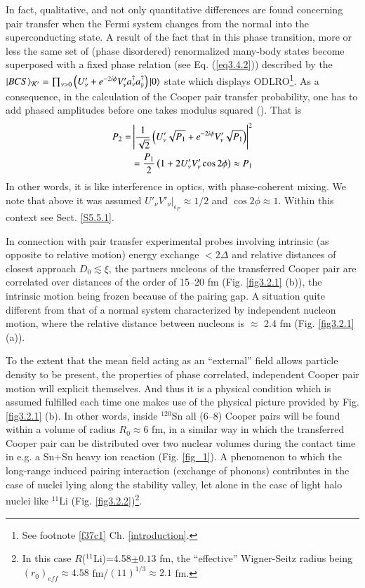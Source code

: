In fact, qualitative, and not only quantitative differences are found concerning pair transfer  when the Fermi system changes from the normal into the superconducting state. A result of the fact that in this phase transition, more or less the same set of (phase disordered) renormalized many-body states  become superposed with a fixed phase relation (see Eq. (\ref{eq3.4.2})) described by the $|{BCS} \rangle_{\mathcal K'}=\prod_{\nu>0}\left(U'_\nu+e^{-2i\phi} V'_\nu a_\nu^\dagger a^\dagger_{\tilde\nu}\right)|{0} \rangle$ state which displays 
 ODLRO\footnote{See footnote \ref{f37c1} Ch. \ref{introduction}.}. As a consequence, in the calculation of the Cooper pair transfer probability, one has to add phased amplitudes before one takes modulus squared 
 (\cite{Josephson:62}). That is
\begin{align}\label{eq3.2.19}
\nonumber P_2=&\left|\frac{1}{\sqrt{2}}\left(U_\nu'\sqrt{P_1}+e^{-2i\phi}V'_\nu\sqrt{P_1}\right)\right|^2\\ \idx{Josephson effect!transfer (tunneling) probability}
&=\frac{P_1}{2}  \left(1+2U_\nu'V_\nu'\cos2\phi\right)\approx P_1 \idx{Cooper pair!transfer probability (Josephson effect)} 
\end{align}
In other words, it is like interference in optics, with phase-coherent mixing. We note that above it was assumed $U'_\nu V'_\nu|_{\epsilon_F}\approx1/2$ and $\cos2\phi\approx1$. Within this context see Sect. \ref{S5.5.1}.
 
 In connection with pair transfer experimental probes involving intrinsic (as opposite to relative motion) energy exchange $<2\Delta$ and relative distances of closest approach $D_0\lesssim \xi$,  the partners nucleons of the transferred Cooper pair are correlated over distances of the order of 15--20 fm  (Fig. \ref{fig3.2.1} (b)), the intrinsic motion being frozen because of the pairing gap. A situation quite different from that of a normal system characterized by independent nucleon motion, where the relative distance between nucleons is  $\approx$ 2.4 fm  (Fig. \ref{fig3.2.1} (a)). 
 
 
 To the extent that the mean field acting as an ``external'' field allows particle density to be present, the properties of phase correlated, independent Cooper pair motion will explicit themselves. And thus it is a physical condition which is assumed fulfilled each time one  makes use of the physical picture provided by Fig. \ref{fig3.2.1} (b). In other words, inside $^{120}$Sn all (6--8) Cooper pairs will be found within a volume of radius $R_0\approx 6$ fm, in a similar way in which the transferred Cooper pair can be distributed over two nuclear volumes during the contact time  in e.g. a Sn+Sn heavy ion reaction (Fig. \ref{fig_1}).  A phenomenon to which the long-range induced pairing interaction (exchange of phonons) contributes in the case of  nuclei lying along the stability valley, let alone in the case of light halo nuclei like $^{11}$Li (Fig. \ref{fig3.2.2})\footnote{In this case $R$($^{11}$Li)=4.58$\pm0.13$ fm, the ``effective'' Wigner-Seitz radius being $(r_0)_{eff}\approx 4.58$ fm/$(11)^{1/3}\approx2.1$ fm.}.
 
